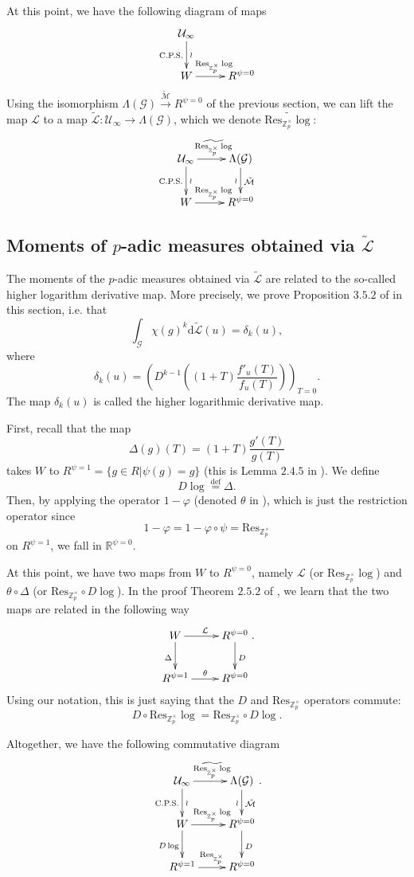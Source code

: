\documentclass[twoside,10pt]{article}
\newcommand{\rarr}{\rightarrow}
\newcommand{\Z}{\mathbb{Z}}
\newcommand{\R}{\mathbb{R}}
\newcommand{\curlG}{\mathcal{G}}
\newcommand{\curlM}{\mathcal{M}}
\newcommand{\curlU}{\mathcal{U}}
\newcommand{\curlL}{\mathcal{L}}
\newcommand{\eqdef}{\overset{\text{def}}{=}}
\renewcommand{\d}{\text{d}}
\newcommand{\Res}{\text{Res}_{\Z_p^\times}}
\begin{document}
At this point, we have the following diagram of maps
\[\xymatrix{
	\curlU_\infty\ar[d]_{\text{C.P.S.}}^{\wr}	&\\
	W\ar[r]^{\Res\log}							& R^{\psi=0}
}\]
Using the isomorphism $\Lambda(\curlG)\overset{\tilde{\curlM}}{\rarr} R^{\psi=0}$ of the previous section, we can lift the map $\curlL$ to a map $\tilde{\curlL}:\curlU_\infty\rarr \Lambda(\curlG)$, which we denote $\widetilde{\Res\log}$:
\[\xymatrix{
	\curlU_\infty\ar[d]_{\text{C.P.S.}}^{\wr}\ar[r]^{\widetilde{\Res\log}}	&\Lambda(\curlG)\ar[d]_{\wr}^{\tilde{\curlM}}\\
	W\ar[r]^{\Res\log}							& R^{\psi=0}\\
}\]

\subsection{Moments of $p$-adic measures obtained via $\tilde{\curlL}$}
The moments of the $p$-adic measures obtained via $\tilde{\curlL}$ are related to the so-called higher logarithm derivative map. More precisely, we prove Proposition $3.5.2$ of \cite{CS} in this section, i.e. that
\[\int_{\curlG}\chi(g)^k\d\tilde{\curlL}(u)=\delta_k(u),\]
where
\[\delta_k(u)=\left (D^{k-1}\left ((1+T)\frac{f'_u(T)}{f_u(T)}\right )\right )_{T=0}.\]
The map $\delta_k(u)$ is called the higher logarithmic derivative map.

First, recall that the map
\[\Delta(g)(T)=(1+T)\frac{g'(T)}{g(T)}\]
takes $W$ to $R^{\psi=1}=\{g\in R|\psi(g)=g\}$ (this is Lemma $2.4.5$ in \cite{CS}). We define
\[D\log\eqdef\Delta.\]
Then, by applying the operator $1-\varphi$ (denoted $\theta$ in \cite{CS}), which is just the restriction operator since
\[1-\varphi=1-\varphi\circ\psi=\Res\]
on $R^{\psi=1}$, we fall in $\R^{\psi=0}$. 

At this point, we have two maps from $W$ to $R^{\psi=0}$, namely $\curlL$ (or $\Res\log$) and $\theta\circ\Delta$ (or $\Res\circ D\log$). In the proof Theorem $2.5.2$ of \cite{CS}, we learn that the two maps are related in the following way
\[\xymatrix{
	W\ar[d]_{\Delta}\ar[r]^{\curlL}	&R^{\psi=0}\ar[d]^{D}\\
	R^{\psi=1}\ar[r]^{\theta}		&R^{\psi=0}
}.\]
Using our notation, this is just saying that the $D$ and $\Res$ operators commute:
\[D\circ\Res\log=\Res\circ D\log.\]

Altogether, we have the following commutative diagram
\[\xymatrix{
	\curlU_\infty\ar[d]_{\text{C.P.S.}}^{\wr}\ar[r]^{\widetilde{\Res\log}}	&\Lambda(\curlG)\ar[d]_{\wr}^{\tilde{\curlM}}\\
	W\ar[d]_{D\log}\ar[r]^{\Res\log}	&R^{\psi=0}\ar[d]^{D}\\
	R^{\psi=1}\ar[r]^{\Res}		&R^{\psi=0}
}.\]
\end{document}
